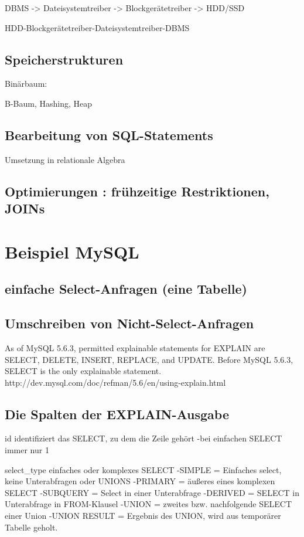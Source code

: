 DBMS -> Dateisystemtreiber -> Blockgerätetreiber -> HDD/SSD 

 HDD-Blockgerätetreiber-Dateisystemtreiber-DBMS

\subsection{Speicherstrukturen}
 Binärbaum:

 B-Baum, Hashing, Heap

\subsection{Bearbeitung von SQL-Statements}
 Umsetzung in relationale Algebra

\subsection{Optimierungen : frühzeitige Restriktionen, JOINs}


\section{Beispiel MySQL}

\subsection{einfache Select-Anfragen (eine Tabelle)}

\subsection{Umschreiben von Nicht-Select-Anfragen}
As of MySQL 5.6.3, permitted explainable statements for EXPLAIN are SELECT, 
DELETE, INSERT, REPLACE, and UPDATE. Before MySQL 5.6.3, SELECT is the only explainable statement.
http://dev.mysql.com/doc/refman/5.6/en/using-explain.html

\subsection{Die Spalten der EXPLAIN-Ausgabe}
id
identifiziert das SELECT, zu dem die Zeile gehört
-bei einfachen SELECT immer nur 1

select_type
einfaches oder komplexes SELECT
-SIMPLE = Einfaches select, keine Unterabfragen oder UNIONS
-PRIMARY = äußeres eines komplexen SELECT
-SUBQUERY = Select in einer Unterabfrage
-DERIVED = SELECT in Unterabfrage in FROM-Klausel
-UNION = zweites bzw. nachfolgende SELECT einer Union
-UNION RESULT = Ergebnis des UNION, wird aus temporärer Tabelle geholt.

